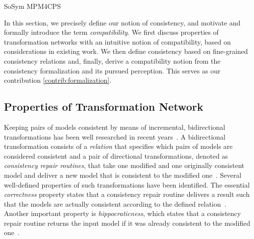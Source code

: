 \begin{copiedFrom}{SoSym MPM4CPS}



In this section, we precisely define our notion of consistency, and motivate and formally introduce the term \emph{compatibility}.
We first discuss properties of transformation networks %
with an intuitive notion of compatibility, based on considerations in existing work.
We then define consistency based on fine-grained consistency relations and,
finally, derive a compatibility notion from the consistency formalization and its pursued perception.
This serves as our contribution \ref{contrib:formalization}.

\subsection{Properties of Transformation Network}
\label{sec:compatibility:networkproperties}

Keeping pairs of models consistent by means of incremental, bidirectional transformations has been well researched in recent years~\cite{stevens2010sosym, etzlstorfer2013a, cleve2019dagstuhl}.
A bidirectional transformation consists of a \emph{relation} that specifies which pairs of models are considered consistent and a pair of directional transformations, denoted as \emph{consistency repair routines}, that take one modified and one originally consistent model and deliver a new model that is consistent to the modified one~\cite{stevens2010sosym}.
Several well-defined properties of such transformations have been identified.
The essential \emph{correctness} property states that a consistency repair routine delivers a result such that the models are actually consistent according to the defined relation~\cite{stevens2010sosym}.
Another important property is \emph{hippocraticness}, which states that a consistency repair routine returns the input model if it was already consistent to the modified one~\cite{stevens2010sosym}.


\end{copiedFrom}
